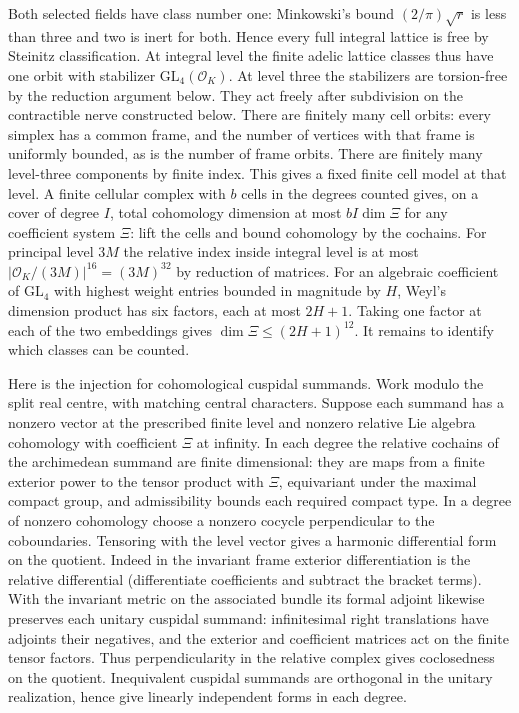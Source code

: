 \documentclass[11pt]{amsart}
\theoremstyle{definition}
\theoremstyle{remark}
\begin{document}
Both selected fields have class number one: Minkowski's bound
$(2/\pi)\sqrt r$ is less than three and two is inert for both.
Hence every full integral lattice is free by Steinitz classification.
At integral level the finite adelic lattice classes thus have one
orbit with stabilizer $\mathrm{GL}_4(\mathcal O_K)$. At level
three the stabilizers are torsion-free by the reduction argument
below. They act freely after subdivision on the contractible nerve
constructed below. There are finitely many cell orbits: every
simplex has a common frame, and the number of vertices with that
frame is uniformly bounded, as is the number of frame orbits.
There are finitely many level-three components by finite index.
This gives a fixed finite cell model at that level.
A finite cellular complex with $b$ cells in the
degrees counted gives, on a cover of degree $I$, total cohomology
dimension at most $bI\dim\Xi$ for any coefficient system $\Xi$:
lift the cells and bound cohomology by the cochains. For principal
level $3M$ the relative index inside integral level is at most
$|\mathcal O_K/(3M)|^{16}=(3M)^{32}$ by reduction of matrices.
For an algebraic coefficient of $\mathrm{GL}_4$ with highest weight
entries bounded in magnitude by $H$, Weyl's dimension product has
six factors, each at most $2H+1$. Taking one factor at each of
the two embeddings gives $\dim\Xi\le(2H+1)^{12}$. It remains to identify which classes can be counted.

Here is the injection for cohomological cuspidal summands. Work
modulo the split real centre, with matching central characters.
Suppose each summand has a nonzero vector at the prescribed finite
level and nonzero relative Lie algebra cohomology with coefficient
$\Xi$ at infinity. In each degree the relative cochains of the
archimedean summand are finite dimensional: they are maps from a
finite exterior power to the tensor product with $\Xi$, equivariant
under the maximal compact group, and admissibility bounds each
required compact type. In a degree of nonzero cohomology choose
a nonzero cocycle perpendicular to the coboundaries. Tensoring with
the level vector gives a harmonic differential form on the quotient.
Indeed in the invariant frame exterior differentiation is the relative
differential (differentiate coefficients and subtract the bracket
terms). With the invariant metric on the associated bundle its
formal adjoint likewise preserves each unitary cuspidal summand:
infinitesimal right translations have adjoints their negatives,
and the exterior and coefficient matrices act on the finite tensor
factors. Thus perpendicularity in the relative complex gives
coclosedness on the quotient. Inequivalent cuspidal summands are
orthogonal in the unitary realization, hence give linearly
independent forms in each degree.
\end{document}
